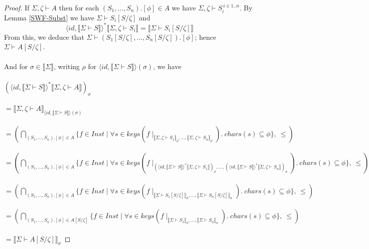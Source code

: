 \documentclass{article}
\newcommand{\sem}[1]{\llbracket #1 \rrbracket}
\newcommand{\sdisp}[1]{
\left( #1 \right)
}
\begin{document}
\begin{proof}
If $\Sigma,\zeta \vdash A$ then for each $(S_1,\ldots,S_n).[\phi] \in A$ we have $\Sigma,\zeta \vdash S_i^{~i \in 1..n}$. By Lemma \ref{SWF-Subst} we have $\Sigma \vdash S_i[S/\zeta]$ and $$\langle \mathit{id}, \sem{\Sigma \vdash S} \rangle^* \sem{\Sigma,\zeta \vdash S_i} = \sem{\Sigma \vdash S_i[S/\zeta]}$$ From this, we deduce that $\Sigma \vdash (S_1[S/\zeta],\ldots,S_n[S/\zeta]).[\phi]$; hence $\Sigma \vdash A[S/\zeta]$. \\~\\
And for $\sigma \in \sem{\Sigma}$, writing $\rho$ for $\langle \mathit{id}, \sem{\Sigma \vdash S} \rangle(\sigma)$, we have\\~\\ 
$(\langle \mathit{id}, \sem{\Sigma \vdash S} \rangle^* \sem{\Sigma,\zeta \vdash A})_\sigma$\\~\\
$= \sem{\Sigma,\zeta \vdash A}_{\langle \mathit{id}, \sem{\Sigma \vdash S} \rangle(\sigma)}$\\~\\
$= \sdisp{\bigcap_{(S_1,\ldots,S_n).[\phi] \in A} \{ f \in \mathit{Inst} \mid \forall s \in \mathit{keys}(f \! \mid_{\sem{\Sigma,\zeta \vdash S_1}_\rho, \ldots, \sem{\Sigma,\zeta \vdash S_n}_\rho}).~\mathit{chars}(s) \subseteq \phi \},~\leq}$\\~\\
$= \sdisp{\bigcap_{(S_1,\ldots,S_n).[\phi] \in A} \{ f \in \mathit{Inst} \mid \forall s \in \mathit{keys}(f \! \mid_{   (\langle \mathit{id}, \sem{\Sigma \vdash S} \rangle^* \sem{\Sigma,\zeta \vdash S_1})_\sigma, \ldots, (\langle \mathit{id}, \sem{\Sigma \vdash S} \rangle^* \sem{\Sigma,\zeta \vdash S_n})_\sigma}).~\mathit{chars}(s) \subseteq \phi \},~\leq}$\\~\\
$= \sdisp{\bigcap_{(S_1,\ldots,S_n).[\phi] \in A} \{ f \in \mathit{Inst} \mid \forall s \in \mathit{keys}(f \! \mid_{   \sem{\Sigma \vdash S_1[S/\zeta]}_\sigma, \ldots, \sem{\Sigma \vdash S_n[S/\zeta]}_\sigma}).~\mathit{chars}(s) \subseteq \phi \},~\leq}$\\~\\
$= \sdisp{\bigcap_{(S_1,\ldots,S_n).[\phi] \in A[S/\zeta]} \{ f \in \mathit{Inst} \mid \forall s \in \mathit{keys}(f \! \mid_{\sem{\Sigma \vdash S_1}_\sigma, \ldots, \sem{\Sigma \vdash S_n}_\sigma}).~\mathit{chars}(s) \subseteq \phi \},~\leq}$\\~\\
$= \sem{\Sigma \vdash A[S/\zeta]}_\sigma$
\end{proof}~\\
\end{document}
